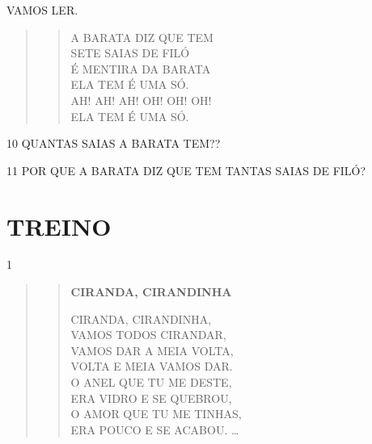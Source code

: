 \pagebreak

VAMOS LER.

\begin{quote}
\begin{verse}
A BARATA DIZ QUE TEM\\
SETE SAIAS DE FILÓ\\
É MENTIRA DA BARATA\\
ELA TEM É UMA SÓ.\\
AH! AH! AH! OH! OH! OH!\\
ELA TEM É UMA SÓ.
\end{verse}

\end{quote}

\num{10} QUANTAS SAIAS A BARATA TEM??


\num{11} POR QUE A BARATA DIZ QUE TEM TANTAS SAIAS DE FILÓ?


\section{TREINO}


\num{1}

\begin{minipage}{.8\textwidth}
\begin{quote}
\begin{verse}
\textbf{CIRANDA, CIRANDINHA}

CIRANDA, CIRANDINHA,\\
VAMOS TODOS CIRANDAR,\\
VAMOS DAR A MEIA VOLTA,\\
VOLTA E MEIA VAMOS DAR.\\
O ANEL QUE TU ME DESTE,\\
ERA VIDRO E SE QUEBROU,\\
O AMOR QUE TU ME TINHAS,\\
ERA POUCO E SE ACABOU. \ldots{}
\end{verse}%
\end{quote}
\end{minipage}
\begin{minipage}{.2\textwidth}
\end{minipage}

